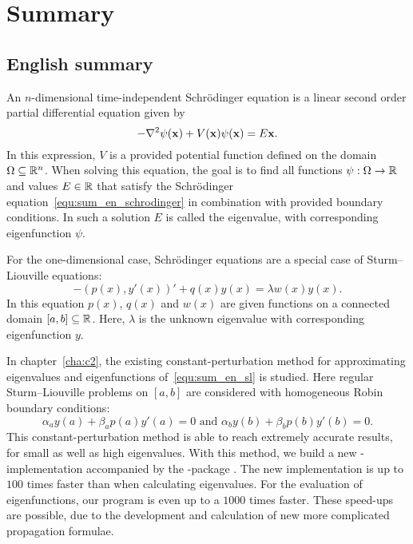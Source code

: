 


\chapter*{Summary}


\section*{English summary}

An $n$-dimensional time-independent Schrödinger equation is a linear second order partial differential equation given by
\begin{equation}\label{equ:sum_en_schrodinger}
-\nabla^2 \psi(\vb{x}) + V(\vb{x}) \psi(\vb{x}) = E\vb{x}\text{.}
\end{equation}
In this expression, $V$ is a provided potential function defined on the domain $\Omega \subseteq \mathbb{R}^n$. When solving this equation, the goal is to find all functions $\psi : \Omega \to \mathbb{R}$ and values $E \in \mathbb{R}$ that satisfy the Schrödinger equation~\eqref{equ:sum_en_schrodinger} in combination with provided boundary conditions. In such a solution $E$ is called the eigenvalue, with corresponding eigenfunction $\psi$.

For the one-dimensional case, Schrödinger equations are a special case of Sturm--Liouville equations:
\begin{equation}\label{equ:sum_en_sl}
    -(p(x), y'(x))' + q(x) y(x) = \lambda w(x) y(x) \text{.}
\end{equation}
In this equation $p(x)$, $q(x)$ and $w(x)$ are given functions on a connected domain $[a, b] \subseteq \mathbb{R}$. Here, $\lambda$ is the unknown eigenvalue with corresponding eigenfunction $y$.

In chapter~\ref{cha:c2}, the existing constant-perturbation method for approximating eigenvalues and eigenfunctions of~\eqref{equ:sum_en_sl} is studied. Here regular Sturm--Liouville problems on $[a, b]$ are considered with homogeneous Robin boundary conditions:
$$
\alpha_a y(a) + \beta_a p(a) y'(a) = 0 \text{ and } \alpha_b y(b) + \beta_b p(b) y'(b) = 0\text{.}
$$
This constant-perturbation method is able to reach extremely accurate results, for small as well as high eigenvalues. With this method, we build a new \cpp{}-implementation  accompanied by the \lpython{}-package \pyslise{}. The new implementation is up to $100$ times faster than  when calculating eigenvalues. For the evaluation of eigenfunctions, our program is even up to a $1000$ times faster. These speed-ups are possible, due to the development and calculation of new more complicated propagation formulae.

